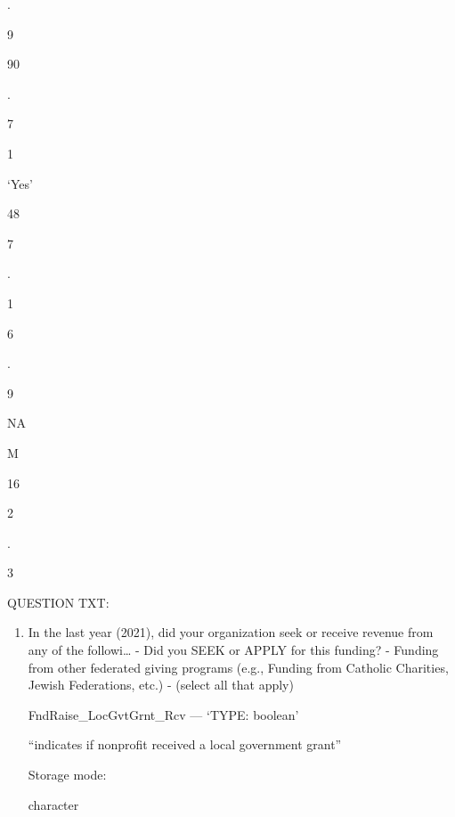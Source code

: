 \documentclass[
  letterpaper,
]{scrbook}
\providecommand{\tightlist}{%
  \setlength{\itemsep}{0pt}\setlength{\parskip}{0pt}}\usepackage{longtable,booktabs,array}
\begin{document}
\begin{enumerate}
\begin{enumerate}
\begin{enumerate}
\begin{enumerate}
\begin{enumerate}
\begin{enumerate}
\begin{enumerate}
\begin{enumerate}
\begin{enumerate}
\begin{enumerate}
\begin{enumerate}
\begin{enumerate}
                        .

                        9

                        90

                        .

                        7

                        1

                        `Yes'

                        48

                        7

                        .

                        1

                        6

                        .

                        9

                        NA

                        M

                        16

                        2

                        .

                        3

                        QUESTION TXT:

                        \begin{enumerate}
                        \def\labelenumxiii{\arabic{enumxiii}.}
                        \tightlist
                        \item
                          In the last year (2021), did your organization
                          seek or receive revenue from any of the
                          followi\ldots{} - Did you SEEK or APPLY for
                          this funding? - Funding from other federated
                          giving programs (e.g., Funding from Catholic
                          Charities, Jewish Federations, etc.) - (select
                          all that apply)

                          FndRaise\_LocGvtGrnt\_Rcv --- {`TYPE:
                          boolean'}

                          ``indicates if nonprofit received a local
                          government grant''

                          Storage mode:

                          character


\end{enumerate}
\end{enumerate}
\end{enumerate}
\end{enumerate}
\end{enumerate}
\end{enumerate}
\end{enumerate}
\end{enumerate}
\end{enumerate}
\end{enumerate}
\end{enumerate}
\end{enumerate}
\end{enumerate}
\end{document}
